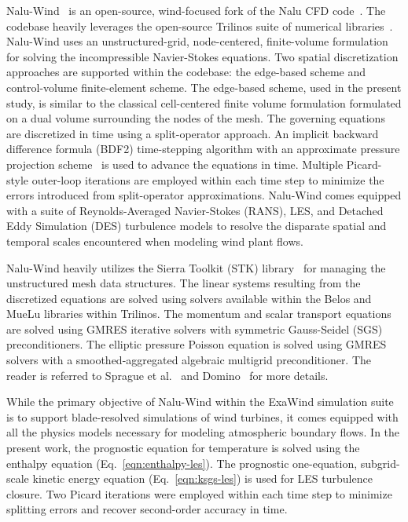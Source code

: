 Nalu-Wind~\cite{SpragueAVR2020} is an open-source, wind-focused fork of the Nalu CFD
code~\cite{Domino:2015}. The codebase heavily leverages the open-source Trilinos
suite of numerical libraries~\cite{Heroux:2003}. Nalu-Wind uses an
unstructured-grid, node-centered, finite-volume formulation for solving the incompressible
Navier-Stokes equations. Two spatial discretization approaches are supported
within the codebase: the edge-based scheme and control-volume finite-element
scheme. The edge-based scheme, used in the present study, is similar to the
classical cell-centered finite volume formulation formulated on a dual volume
surrounding the nodes of the mesh. The governing equations are discretized in
time using a split-operator approach. An implicit backward difference formula
(BDF2) time-stepping algorithm with an approximate pressure projection
scheme~\cite{Moen-Domino:2003} is used to advance the equations in time.
Multiple Picard-style outer-loop iterations are employed within each time step
to minimize the errors introduced from split-operator approximations. Nalu-Wind
comes equipped with a suite of Reynolds-Averaged Navier-Stokes (RANS), LES, and
Detached Eddy Simulation (DES) turbulence models to resolve the disparate
spatial and temporal scales encountered when modeling wind plant flows.

Nalu-Wind heavily utilizes the Sierra Toolkit (STK) library~\cite{Edwards:2010}
for managing the unstructured mesh data structures. The linear systems resulting
from the discretized equations are solved using solvers available within the
Belos and MueLu libraries within Trilinos. The momentum and scalar transport
equations are solved using GMRES iterative solvers with symmetric Gauss-Seidel
(SGS) preconditioners. The elliptic pressure Poisson equation is solved using
GMRES solvers with a smoothed-aggregated algebraic multigrid preconditioner. The
reader is referred to Sprague et al.~\cite{SpragueAVR2020} and
Domino~\cite{Domino:2015} for more details.

While the primary objective of Nalu-Wind within the ExaWind simulation suite is
to support blade-resolved simulations of wind turbines, it comes equipped
with all the physics models necessary for modeling atmospheric boundary flows.
In the present work, the prognostic equation for temperature is solved using the
enthalpy equation (Eq.~\ref{eqn:enthalpy-les}). The prognostic one-equation,
subgrid-scale kinetic energy equation (Eq.~\ref{eqn:ksgs-les}) is used for LES
turbulence closure. Two Picard iterations were employed within each time step to
minimize splitting errors and recover second-order accuracy in time.

